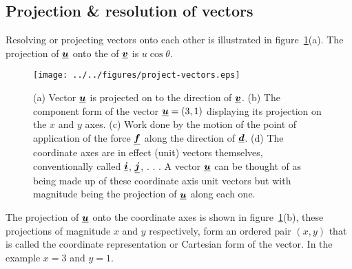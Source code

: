 



\addtolength{\topmargin}{-0.7 cm}
\setlength{\columnsep}{22pt}


\subsection*{Projection \& resolution of vectors}
Resolving or projecting vectors onto each other is illustrated in
figure~\ref{fig:project-vectors}(a).  The projection of $\mathit{\underline{\boldsymbol{u}}}$ onto the  of $\mathit{\underline{\boldsymbol{v}}}$ is $u \cos\theta$.
\begin{figure}[h!]
\centering
\texttt{[image: ../../figures/project-vectors.eps]}
\caption{(a) Vector $\mathit{\underline{\boldsymbol{u}}}$ is projected on to the direction of $\mathit{\underline{\boldsymbol{v}}}$.  (b) The component form of the vector $\mathit{\underline{\boldsymbol{u}}} = (3,1)$ displaying its projection on the $x$ and $y$ axes. (c) Work done by the motion of the point of application of the force $\mathit{\underline{\boldsymbol{f}}}$ along the direction of $\mathit{\underline{\boldsymbol{d}}}$. (d) The coordinate axes are in effect (unit) vectors themselves, conventionally called $\mathit{\underline{\boldsymbol{i}}}$, $\mathit{\underline{\boldsymbol{j}}}$, . . . A vector $\mathit{\underline{\boldsymbol{u}}}$ can be thought of as being made up of these coordinate axis unit vectors but with magnitude being the projection of $\mathit{\underline{\boldsymbol{u}}}$ along each one. }\label{fig:project-vectors}
\end{figure}
The projection of $\mathit{\underline{\boldsymbol{u}}}$ onto the coordinate axes is shown in figure~\ref{fig:project-vectors}(b), these projections of magnitude $x$ and $y$ respectively, form an ordered pair $(x,y)$ that is called the coordinate representation or Cartesian form of the vector.  In the example $x=3$ and $y=1$.
